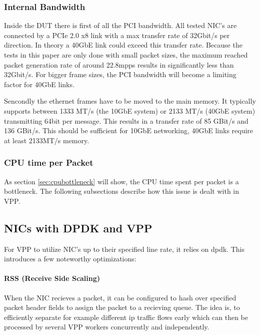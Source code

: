 \subsubsection{Internal Bandwidth}


Inside the DUT there is first of all the PCI bandwidth. All tested
NIC's are connected by a PCIe 2.0 x8 link with a max transfer rate of
32Gbit/s per direction. In theory a 40GbE link could exceed this
transfer rate. Because the tests in this paper are only done with
small packet sizes, the maximum reached packet generation rate of
around 22.8mpps results in significantly less than 32Gbit/s. For
bigger frame sizes, the PCI bandwidth will become a limiting factor
for 40GbE links.


Sencondly the ethernet frames have to be moved to the main memory. It
typically supports between 1333 MT/s (the 10GbE system) or 2133 MT/s
(40GbE system) transmitting 64bit per message. This results in a
transfer rate of 85 GBit/s and 136 GBit/s. This should be sufficient
for 10GbE networking, 40GbE links require at least 2133MT/s memory.

\subsubsection{CPU time per Packet}

As section \ref{sec:cpubottleneck} will show, the CPU time spent per
packet is a bottleneck. The following subsections describe how this
issue is dealt with in VPP.




\subsection{NICs with DPDK and VPP}

For VPP to utilize NIC's up to their specified line rate, it relies on
\Ac{dpdk}. This introduces a few noteworthy optimizations:

\paragraph{RSS (Receive Side Scaling)}
\label{sec:rss}

When the NIC recieves a packet, it can be configured to hash over
specified packet header fields to assign the packet to a recieving
queue. The idea is, to efficiently separate for example different ip
traffic flows early which can then be processed by several VPP workers
concurrently and independently. \cite{linguaglossa2017high}

